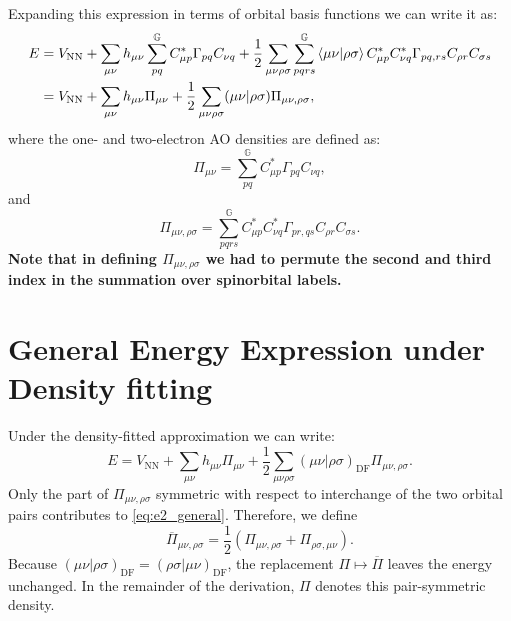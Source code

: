 \documentclass[aip,preprint]{revtex4-1}
\newcommand{\df}{\mathrm{DF}}
\begin{document}
Expanding this expression in terms of orbital basis functions we can write it as:
\begin{equation}
\begin{split}
E
& = V_\mathrm{NN} +
\sum_{\mu \nu} h_{\mu\nu} \sum_{pq}^{\mathbb{G}} C_{\mu p}^* \Gamma_{pq} C_{\nu q}
+
\frac{1}{2}
\sum_{\mu \nu \rho \sigma}
\sum_{pqrs}^{\mathbb{G}} \braket{\mu \nu |\rho \sigma }
C_{\mu p}^* C_{\nu q}^* \Gamma_{pq,rs}
C_{\rho r} C_{\sigma s} \\
& = V_\mathrm{NN} + \sum_{\mu \nu} h_{\mu\nu} \Pi_{\mu \nu}
+
\frac{1}{2}
\sum_{\mu \nu \rho \sigma}
(\mu \nu |\rho \sigma)
\Pi_{\mu \nu,\rho \sigma},
\label{eq:ao_spinorbital_energy}
\end{split}
\end{equation}
where the one- and two-electron AO densities are defined as:
\begin{equation}
\Pi_{\mu \nu} = \sum_{pq}^{\mathbb{G}} C_{\mu p}^* \Gamma_{pq} C_{\nu q},
\end{equation}
and
\begin{equation}
\Pi_{\mu \nu,\rho \sigma} = \sum_{pqrs}^{\mathbb{G}} 
C_{\mu p}^* C_{\nu q}^* \Gamma_{pr,qs}
C_{\rho r} C_{\sigma s}.
\end{equation}
\textbf{Note that in defining $\Pi_{\mu \nu,\rho \sigma}$ we had to permute the second and third index in the summation over spinorbital labels.}

\section{General Energy Expression under Density fitting}

Under the density-fitted approximation we can write:
\begin{equation}
E = V_\mathrm{NN} +
\sum_{\mu \nu} h_{\mu\nu} \Pi_{\mu \nu}
+
\frac{1}{2}
\sum_{\mu \nu \rho \sigma}
(\mu \nu |\rho \sigma)_\df
\Pi_{\mu \nu,\rho \sigma}.
\label{eq:e2_general}
\end{equation}
Only the part of $\Pi_{\mu \nu,\rho \sigma}$ symmetric with respect to interchange of the two orbital
pairs contributes to \cref{eq:e2_general}.
Therefore, we define
\begin{equation}
\overline{\Pi}_{\mu\nu,\rho\sigma}
= \frac{1}{2}
\left(
\Pi_{\mu\nu,\rho\sigma}
+ \Pi_{\rho\sigma,\mu\nu}
\right).
\label{eq:pair_symmetric_density}
\end{equation}
Because
$(\mu\nu|\rho\sigma)_\df = (\rho\sigma|\mu\nu)_\df$, the replacement
$\Pi \mapsto \overline{\Pi}$ leaves the energy unchanged.  In the remainder of
the derivation, $\Pi$ denotes this pair-symmetric density.
\end{document}
